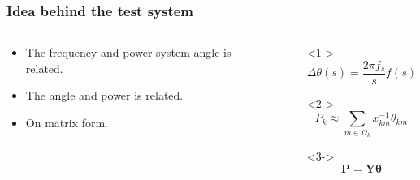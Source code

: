 \begin{frame}
	\frametitle{Idea behind the test system}
	\begin{columns}
		\begin{column}{0.5\textwidth}
			\begin{itemize}
				\item<1-> The frequency and power system angle is related.
				\item<2-> The angle and power is related.
				\item<3-> On matrix form.
			\end{itemize}
		\end{column}
		\begin{column}{0.5\textwidth}
			\begin{itemize}
				\item[]<1->
					\begin{equation}
							\Delta \theta(s) = \frac{2\pi f_s}{s}f(s)
						\end{equation}
				\item[]<2->
					\begin{equation}
						P_k \approx \sum_{m\in \Omega_k}{x^{-1}_{km}\theta_{km}}
					\end{equation}
				\item[]<3->
					\begin{equation}
						\mathbf{P}=\mathbf{Y}\mathbf{\theta}
					\end{equation}
			\end{itemize}
		\end{column}
	\end{columns}
\end{frame}


